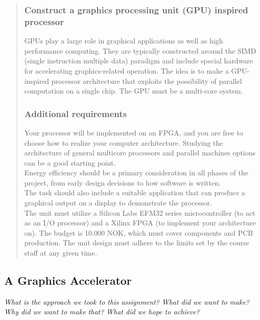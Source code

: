 \documentclass[../main/report.tex]{subfiles}
\begin{document}
\begin{quotation}
	\subsubsection{Construct a graphics processing unit (GPU) inspired processor}
    \noindent GPUs play a large role in graphical applications as well as high performance computing.
    They are typically constructed around the SIMD (single instruction multiple data) paradigm and
    include special hardware for accelerating graphics-related operation. The idea is to make a
    GPU-inspired processor architecture that exploits the possibility of parallel computation on a
    single chip. The GPU must be a multi-core system.
    
    \subsubsection{Additional requirements}
    \noindent Your processor will be implemented on an FPGA, and you are free to choose how to
    realize your computer architecture. Studying the architecture of general multicore processors
    and parallel machines options can be a good starting point.\\
    
    \noindent Energy efficiency should be a primary consideration in all phases of the project, from early
    design decisions to how software is written.\\
    
    \noindent The task should also include a suitable application that can produce a graphical output on a
    display to demonstrate the processor.\\
    
    \noindent The unit must utilize a Silicon Labs EFM32 series microcontroller (to act as an I/O processor)
    and a Xilinx FPGA (to implement your architecture on). The budget is 10.000 NOK, which must
    cover components and PCB production. The unit design must adhere to the limits set by the
    course staff at any given time.
\end{quotation}
\newpage

\subsection{A Graphics Accelerator}

\textit{What is the approach we took to this assignment?}
\textit{What did we want to make?}
\textit{Why did we want to make that?}
\textit{What did we hope to achieve?}
\end{document}
